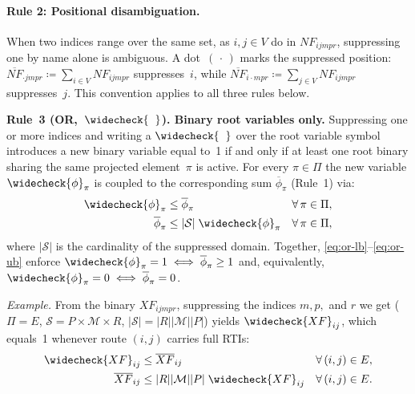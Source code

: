 \begin{convention}
\paragraph{Rule 2: Positional disambiguation.}
When two indices range over the same set, as $i,j\in V$ do in
$NF_{ijmpr}$, suppressing one by name alone is ambiguous. A
dot~$(\,\cdot\,)$ marks the suppressed position:
$\overline{NF}_{\cdot jmpr}\coloneqq\sum_{i\in V}NF_{ijmpr}$
suppresses~$i$, while
$\overline{NF}_{i\cdot mpr}\coloneqq\sum_{j\in V}NF_{ijmpr}$
suppresses~$j$. This convention applies to all three rules below.

\medskip
\noindent\textbf{Rule~3
  \textnormal{(OR,~$\widecheck{\phantom{x}}$).}
  Binary root variables only.}
Suppressing one or more indices and writing a
$\widecheck{\phantom{x}}$ over the root variable symbol introduces a
new binary variable equal to~1 if and only if at least one root binary
sharing the same projected element~$\pi$ is active. For every
$\pi\in\Pi$ the new variable $\widecheck{\phi}_{\pi}$ is coupled to
the corresponding sum $\overline{\phi}_{\pi}$ (Rule~1) via:
\begin{align}
  \widecheck{\phi}_{\pi}
    &\leq \overline{\phi}_{\pi}
    && \forall\,\pi\in\Pi,
    \label{eq:or-lb} \\
  \overline{\phi}_{\pi}
    &\leq |\mathcal{S}|\;\widecheck{\phi}_{\pi}
    && \forall\,\pi\in\Pi,
    \label{eq:or-ub}
\end{align}
where $|\mathcal{S}|$ is the cardinality of the suppressed domain.
Together, \eqref{eq:or-lb}--\eqref{eq:or-ub} enforce
$\widecheck{\phi}_{\pi}=1 \iff \overline{\phi}_{\pi}\geq 1$ and,
equivalently, $\widecheck{\phi}_{\pi}=0 \iff
\overline{\phi}_{\pi}=0$.

\smallskip\noindent\textit{Example.}
From the binary $XF_{ijmpr}$, suppressing the indices $m, p, $ and $r$ we get 
($\Pi=E$, $\mathcal{S}=P\times\mathcal{M}\times R$,
$|\mathcal{S}|=|R||\mathcal{M}||P|$)
yields $\widecheck{XF}_{ij}$, which equals~1 whenever route
$(i,j)$ carries full RTIs:
\begin{align}
  \widecheck{XF}_{ij}
    &\leq \overline{XF}_{ij}
    && \forall\,(i,j)\in E,
    \label{eq:or-ex-lb} \\
  \overline{XF}_{ij}
    &\leq |R||\mathcal{M}||P|\;\widecheck{XF}_{ij}
    && \forall\,(i,j)\in E.
    \label{eq:or-ex-ub}
\end{align}


\end{convention}
